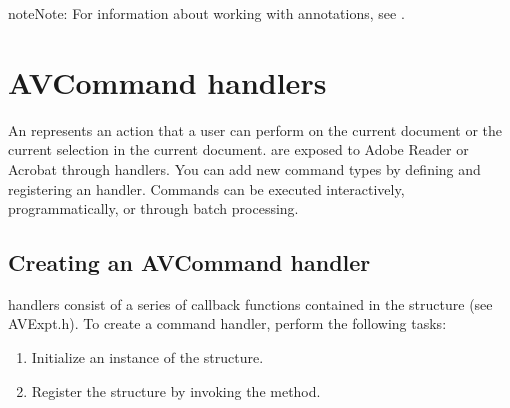\documentclass[letterpaper,12pt,english,openany,oneside]{sphinxmanual}
\begin{document}
\begin{sphinxadmonition}{note}{Note:}
For information about working with annotations, see .
\end{sphinxadmonition}


\section{AVCommand handlers}
\label{\detokenize{Plugins_Handlers:avcommand-handlers}}
An  represents an action that a user can perform on the current document or the current selection in the current document.  are exposed to Adobe Reader or Acrobat through  handlers. You can add new command types by defining and registering an  handler. Commands can be executed interactively, programmatically, or through batch processing.


\subsection{Creating an AVCommand handler}
\label{\detokenize{Plugins_Handlers:creating-an-avcommand-handler}}
 handlers consist of a series of callback functions contained in the  structure (see AVExpt.h). To create a command handler, perform the following tasks:
\begin{enumerate}
%
\item {} 
Initialize an instance of the  structure.

\item {} 
Register the  structure by invoking the  method.

\end{enumerate}
\end{document}
